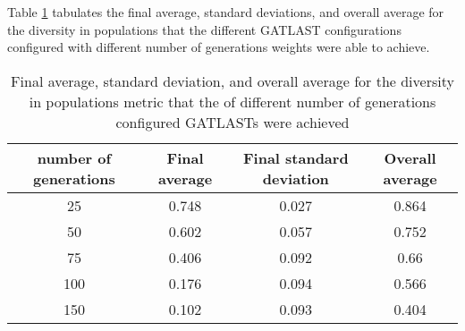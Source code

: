 Table \ref{tab:HP:GA:numGenerations:diversity in populations} tabulates the final average, standard deviations, and overall average for the diversity in populations that the different GATLAST configurations configured with different number of generations weights were able to achieve.
\begin{table}[tbh!]
\centering
\begin{adjustbox}{trim=0cm 0cm 0cm 0cm, clip=true}
\begin{tabular}{|c|c|c|c|}
\hline
number of generations & Final average & Final standard deviation & Overall average\\
\hline
25 & 0.748 & 0.027 & 0.864\\\hline
50 & 0.602 & 0.057 & 0.752\\\hline
75 & 0.406 & 0.092 & 0.66\\\hline
100 & 0.176 & 0.094 & 0.566\\\hline
150 & 0.102 & 0.093 & 0.404\\\hline
\end{tabular}
\end{adjustbox}
\caption{Final average, standard deviation, and overall average for the diversity in populations metric that the of different number of generations configured GATLASTs were achieved}
\label{tab:HP:GA:numGenerations:diversity in populations}
\end{table}